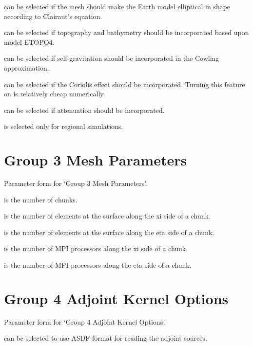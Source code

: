 \documentclass[english]{book}
\begin{document}
 can be selected if the mesh should make the Earth model
elliptical in shape according to Clairaut’s equation.

 can be selected if topography and bathymetry should be
incorporated based upon model ETOPO4.

 can be selected if self-gravitation should be incorporated
in the Cowling approximation.

 can be selected if the Coriolis effect should be
incorporated. Turning this feature on is relatively cheap numerically.

 can be selected if attenuation should be incorporated.

 is selected only for regional simulations.


\section{Group 3 \textendash{} Mesh Parameters}
\label{\detokenize{Appendix2:a2-4-group-3-mesh-parameters}}

 Parameter form for ‘Group 3 \textendash{} Mesh Parameters’.

 is the number of chunks.

 is the number of elements at the surface along the xi side
of a chunk.

 is the number of elements at the surface along the eta side
of a chunk.

 is the number of MPI processors along the xi side of a
chunk.

 is the number of MPI processors along the eta side of a
chunk.


\section{Group 4 \textendash{} Adjoint Kernel Options}
\label{\detokenize{Appendix2:a2-5-group-4-adjoint-kernel-options}}

 Parameter form for ‘Group 4 \textendash{} Adjoint Kernel
Options’.

 can be selected to use ASDF format for reading
the adjoint sources.
\end{document}
